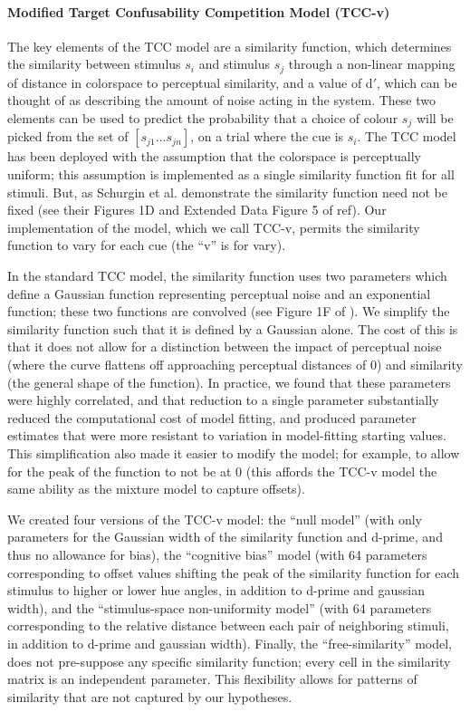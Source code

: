 \paragraph{Modified Target Confusability Competition Model (TCC-v)}\label{para:TCC}

The key elements of the TCC model are a similarity function, which determines the similarity between stimulus $s_i$ and stimulus $s_j$ through a non-linear mapping of distance in colorspace to perceptual similarity, and a value of d$\prime$, which can be thought of as describing the amount of noise acting in the system. These two elements can be used to predict the probability that a choice of colour $s_j$ will be picked from the set of $\left[s_{j1}...s_{jn}\right]$, on a trial where the cue is $s_i$. 
The TCC model has been deployed with the assumption that the colorspace is perceptually uniform; this assumption is implemented as a single similarity function fit for all stimuli. 
But, as Schurgin et al. \citep{schurgin_psychophysical_2020} demonstrate the similarity function need not be fixed (see their Figures 1D and Extended Data Figure 5 of ref). 
Our implementation of the model, which we call TCC-v, permits the similarity function to vary for each cue (the “v” is for vary). 

In the standard TCC model, the similarity function uses two parameters which define a Gaussian function representing perceptual noise and an exponential function; these two functions are convolved (see Figure 1F of \citep{schurgin_psychophysical_2020}). 
We simplify the similarity function such that it is defined by a Gaussian alone. 
The cost of this is that it does not allow for a distinction between the impact of perceptual noise (where the curve flattens off approaching perceptual distances of 0) and similarity (the general shape of the function). 
In practice, we found that these parameters were highly correlated, and that reduction to a single parameter substantially reduced the computational cost of model fitting, and produced parameter estimates that were more resistant to variation in model-fitting starting values. This simplification also made it easier to modify the model; for example, to allow for the peak of the function to not be at 0 (this affords the TCC-v model the same ability as the mixture model to capture offsets).  

We created four versions of the TCC-v model: the “null model” (with only parameters for the Gaussian width of the similarity function and d-prime, and thus no allowance for bias), the “cognitive bias” model (with 64 parameters corresponding to offset values shifting the peak of the similarity function for each stimulus to higher or lower hue angles, in addition to d-prime and gaussian width), and the “stimulus-space non-uniformity model” (with 64 parameters corresponding to the relative distance between each pair of neighboring stimuli, in addition to d-prime and gaussian width). 
Finally, the “free-similarity” model, does not pre-suppose any specific similarity function; every cell in the similarity matrix is an independent parameter. 
This flexibility allows for patterns of similarity that are not captured by our hypotheses. 

